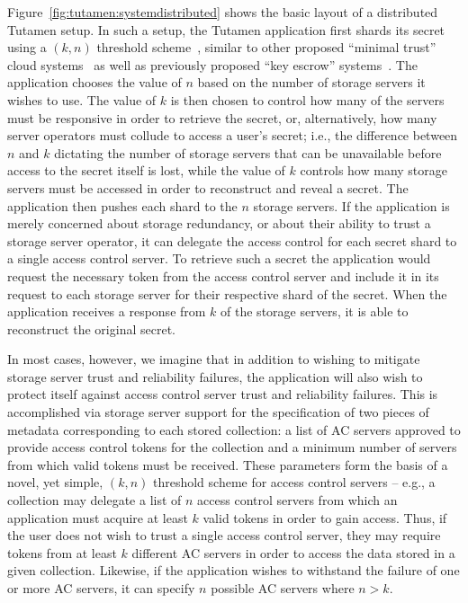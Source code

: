 Figure~\ref{fig:tutamen:systemdistributed} shows the basic layout of a
distributed Tutamen setup. In such a setup, the Tutamen application
first shards its secret using a $(k, n)$ threshold
scheme~\cite{krawczyk1993, shamir1979}, similar to other proposed
``minimal trust'' cloud systems~\cite{bessani2011} as well as
previously proposed ``key escrow'' systems~\cite{blaze1996,
  denning1996}. The application chooses the value of $n$ based on the
number of storage servers it wishes to use. The value of $k$ is then
chosen to control how many of the servers must be responsive in order
to retrieve the secret, or, alternatively, how many server operators
must collude to access a user's secret; i.e., the difference between
$n$ and $k$ dictating the number of storage servers that can be
unavailable before access to the secret itself is lost, while the
value of $k$ controls how many storage servers must be accessed in
order to reconstruct and reveal a secret. The application then pushes
each shard to the $n$ storage servers. If the application is merely
concerned about storage redundancy, or about their ability to trust a
storage server operator, it can delegate the access control for each
secret shard to a single access control server. To retrieve such a
secret the application would request the necessary token from the
access control server and include it in its request to each storage
server for their respective shard of the secret. When the application
receives a response from $k$ of the storage servers, it is able to
reconstruct the original secret.

In most cases, however, we imagine that in addition to wishing to
mitigate storage server trust and reliability failures, the
application will also wish to protect itself against access control
server trust and reliability failures. This is accomplished via
storage server support for the specification of two pieces of metadata
corresponding to each stored collection: a list of AC servers approved
to provide access control tokens for the collection and a minimum
number of servers from which valid tokens must be received. These
parameters form the basis of a novel, yet simple, $(k, n)$ threshold
scheme for access control servers -- e.g., a collection may delegate a
list of $n$ access control servers from which an application must
acquire at least $k$ valid tokens in order to gain access. Thus, if
the user does not wish to trust a single access control server, they
may require tokens from at least $k$ different AC servers in order to
access the data stored in a given collection. Likewise, if the
application wishes to withstand the failure of one or more AC servers,
it can specify $n$ possible AC servers where $n > k$.

